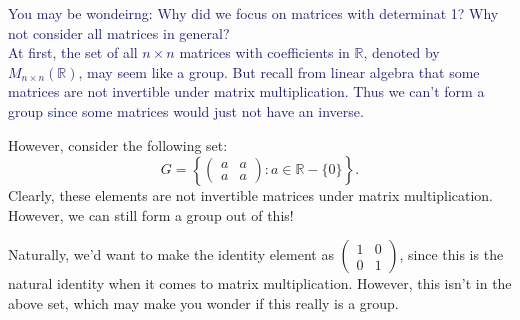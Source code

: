 \documentclass[12pt,letterpaper]{algebra_book}
\theoremstyle{definition}
\begin{document}
\textcolor{MidnightBlue}{
    You may be wondeirng: Why did we focus on matrices with determinat
    1? Why not consider all matrices in general? 
    \\
    \indent At first, the set of all $n \times n$ matrices with
    coefficients in $\mathbb{R}$, denoted by $M_{n\times
    n}(\mathbb{R})$, may seem like a group. But recall from linear
    algebra that some matrices are not invertible under matrix
    multiplication. Thus we can't form a group since some matrices
    would just not have an inverse. 
}

    However, consider the following set:
    \[
        G = \left\{ 
            \begin{pmatrix}
                a & a\\
                a & a
            \end{pmatrix}
            : a \in \mathbb{R}-\{0\} \right\}.
    \]
    Clearly, these elements are not invertible matrices under matrix
    multiplication. However, we can still form a group out of this!

    Naturally, we'd want to make the identity element as
    $\displaystyle 
    \begin{pmatrix}
        1 & 0\\
        0 & 1
    \end{pmatrix}$, since this is the natural identity when it comes
    to matrix multiplication. However, this isn't in the above set,
    which may make you wonder if this really is a group.
\end{document}
